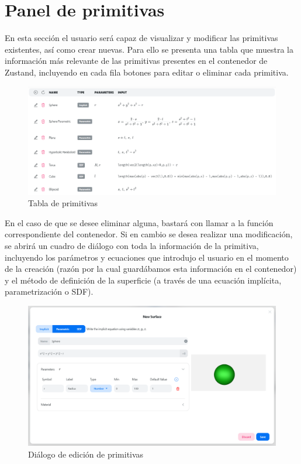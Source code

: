 \section{Panel de primitivas}
En esta sección el usuario será capaz de visualizar y modificar las primitivas existentes, así como crear nuevas. Para ello se presenta una tabla que muestra la información más relevante de las primitivas presentes en el contenedor de Zustand, incluyendo en cada fila botones para editar o eliminar cada primitiva. 
\begin{figure}[ht!]
    \centering
    \includegraphics[width=\textwidth]{Plantilla-TFG-master/img/tablaParam.png}
    \caption{Tabla de primitivas}
\end{figure}

En el caso de que se desee eliminar alguna, bastará con llamar a la función correspondiente del contenedor. Si en cambio se desea realizar una modificación, se abrirá un cuadro de diálogo con toda la información de la primitiva, incluyendo los parámetros y ecuaciones que introdujo el usuario en el momento de la creación (razón por la cual guardábamos esta información en el contenedor) y el método de definición de la superficie (a través de una ecuación implícita, parametrización o SDF).\newline
\begin{figure}[ht!]
    \centering
    \includegraphics[width=\textwidth]{Plantilla-TFG-master/img/panel.png}
    \caption{Diálogo de edición de primitivas}
\end{figure}

